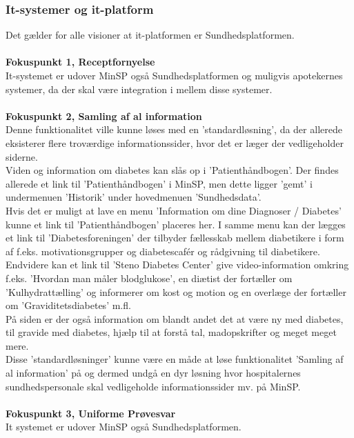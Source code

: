 \subsubsection{It-systemer og it-platform}
Det gælder for alle visioner at it-platformen er Sundhedsplatformen.\\\\
\textbf{Fokuspunkt 1, Receptfornyelse} \\
It-systemet er udover MinSP også Sundhedsplatformen og muligvis apotekernes systemer, da der skal være integration i mellem disse systemer.
\\\\
\textbf{Fokuspunkt 2, Samling af al information} \\
 Denne funktionalitet ville kunne løses med en 'standardløsning', da der allerede eksisterer flere troværdige informationssider, hvor det er læger der vedligeholder siderne. \\
 Viden og information om diabetes kan slås op i 'Patienthåndbogen'. Der findes allerede et link til 'Patienthåndbogen' i MinSP, men dette ligger 'gemt' i undermenuen 'Historik' under hovedmenuen 'Sundhedsdata'.\\
 Hvis det er muligt at lave en menu 'Information om dine Diagnoser / Diabetes' kunne et link til 'Patienthåndbogen' placeres her. 
 I samme menu kan der lægges et link til 'Diabetesforeningen' der tilbyder fællesskab mellem diabetikere i form af f.eks. motivationsgrupper og diabetescafér og rådgivning til diabetikere.\\
 Endvidere kan et link til 'Steno Diabetes Center' give video-information omkring f.eks. 'Hvordan man måler blodglukose', en diætist der fortæller om 'Kulhydrattælling' og informerer om kost og motion og en overlæge der fortæller om 'Graviditetsdiabetes' m.fl. \\
 På siden er der også information om blandt andet det at være ny med diabetes, til gravide med diabetes, hjælp til at forstå tal, madopskrifter og meget meget mere. \\ 
 Disse 'standardløsninger' kunne være en måde at løse funktionalitet 'Samling af al information' på og dermed undgå en dyr løsning hvor hospitalernes sundhedspersonale skal vedligeholde informationssider mv. på MinSP.
 \\\\
 \textbf{Fokuspunkt 3, Uniforme Prøvesvar} \\
 It systemet er udover MinSP også Sundhedsplatformen.
